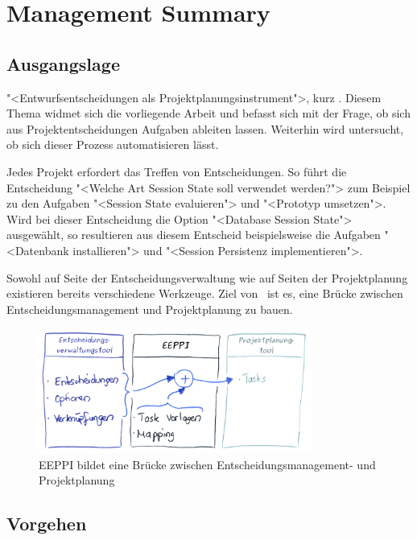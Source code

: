 \chapter{Management Summary}
	\captionsetup[figure]{labelformat=empty} %

	
	\section{Ausgangslage}
	
	"<Entwurfsentscheidungen als Projektplanungsinstrument">, kurz \eeppi. 
	Diesem Thema widmet sich die vorliegende Arbeit und befasst sich mit der Frage, 
	ob sich aus Projektentscheidungen Aufgaben ableiten lassen. 
	Weiterhin wird untersucht, ob sich dieser Prozess automatisieren lässt. 

	Jedes Projekt erfordert das Treffen von Entscheidungen.	
	So führt die Entscheidung "<Welche Art Session State soll verwendet werden?"> zum Beispiel zu den Aufgaben
	"<Session State evaluieren"> und "<Prototyp umsetzen">.
	Wird bei dieser Entscheidung die Option "<Database Session State"> ausgewählt,
	so resultieren aus diesem Entscheid beispielsweise die Aufgaben "<Datenbank installieren"> und "<Session Persistenz implementieren">.	
	
	Sowohl auf Seite der Entscheidungsverwaltung wie auf Seiten der Projektplanung existieren bereits verschiedene Werkzeuge. 
	Ziel von \eeppi\ ist es, eine Brücke zwischen Entscheidungsmanagement und Projektplanung zu bauen.
	
	\begin{figure}[H]
		\includegraphics[width=0.8\textwidth]{introduction/img/eeppiVision.png}
		\centering
		\caption{EEPPI bildet eine Brücke zwischen Entscheidungsmanagement- und Projektplanung}
		\label{fig:eeppiBridgeBetweenDecisionsAndTasks}
	\end{figure}
	
	
	\section{Vorgehen}
	

